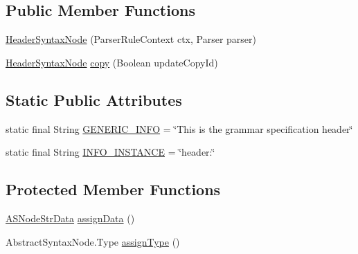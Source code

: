 \subsection*{Public Member Functions}
\begin{DoxyCompactItemize}
\item 
\hyperlink{classit_1_1emarolab_1_1cagg_1_1core_1_1language_1_1syntax_1_1abstractTree_1_1syntaxNodeType_1_1HeaderSyntaxNode_af5e52ac34e6f32f7d7f8b41e7b6b23dd}{Header\-Syntax\-Node} (Parser\-Rule\-Context ctx, Parser parser)
\item 
\hyperlink{classit_1_1emarolab_1_1cagg_1_1core_1_1language_1_1syntax_1_1abstractTree_1_1syntaxNodeType_1_1HeaderSyntaxNode}{Header\-Syntax\-Node} \hyperlink{classit_1_1emarolab_1_1cagg_1_1core_1_1language_1_1syntax_1_1abstractTree_1_1syntaxNodeType_1_1HeaderSyntaxNode_aae235bb3b4cf37113ae5b67b43def954}{copy} (Boolean update\-Copy\-Id)
\end{DoxyCompactItemize}
\subsection*{Static Public Attributes}
\begin{DoxyCompactItemize}
\item 
static final String \hyperlink{classit_1_1emarolab_1_1cagg_1_1core_1_1language_1_1syntax_1_1abstractTree_1_1syntaxNodeType_1_1HeaderSyntaxNode_a49e528de22342c560dc90392befed7c5}{G\-E\-N\-E\-R\-I\-C\-\_\-\-I\-N\-F\-O} = \char`\"{}This is the grammar specification header\char`\"{}
\item 
static final String \hyperlink{classit_1_1emarolab_1_1cagg_1_1core_1_1language_1_1syntax_1_1abstractTree_1_1syntaxNodeType_1_1HeaderSyntaxNode_a7bb1dfc17eed6788ec06c5d5d7478fac}{I\-N\-F\-O\-\_\-\-I\-N\-S\-T\-A\-N\-C\-E} = \char`\"{}header\-:\char`\"{}
\end{DoxyCompactItemize}
\subsection*{Protected Member Functions}
\begin{DoxyCompactItemize}
\item 
\hyperlink{classit_1_1emarolab_1_1cagg_1_1core_1_1language_1_1syntax_1_1abstractTree_1_1AbstractDataFactory_1_1ASNodeStrData}{A\-S\-Node\-Str\-Data} \hyperlink{classit_1_1emarolab_1_1cagg_1_1core_1_1language_1_1syntax_1_1abstractTree_1_1syntaxNodeType_1_1HeaderSyntaxNode_a65df97e233f2a7ac3c7b66e5b261531b}{assign\-Data} ()
\item 
Abstract\-Syntax\-Node.\-Type \hyperlink{classit_1_1emarolab_1_1cagg_1_1core_1_1language_1_1syntax_1_1abstractTree_1_1syntaxNodeType_1_1HeaderSyntaxNode_adeceae2396596c8102c70f6d1a5e67c9}{assign\-Type} ()
\end{DoxyCompactItemize}


